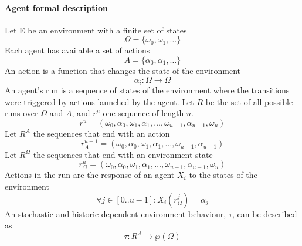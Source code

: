 \documentclass[11pt,oneside,a4paper,openright]{report}
\begin{document}

\paragraph{Agent formal description}
	
Let E be an environment with a finite set of states 
\begin{equation}
	\Omega = \{\omega_0,\omega_1,\ldots \}
\end{equation}
Each agent has available a set of actions 
\begin{equation}
	A = \{ \alpha_0, \alpha_1, \ldots \} 
\end{equation}
An action is a function that changes the state of the environment 
\begin{equation}
	\alpha_i : \Omega \longrightarrow \Omega 
\end{equation}
An agent's run is a sequence of states of the environment where the transitions were triggered 
by actions launched by the agent. Let $R$ be the set of all possible runs over $\Omega$ and $A$, and
$r^{u}$ one sequence of length $u$.
\begin{equation}
	r^{u} = ( \omega_0 , \alpha_0 , \omega_1 , \alpha_1 ,\ldots, \omega_{u-1} , \alpha_{u-1} , \omega_u )
\end{equation}
Let $R^{A}$ the sequences that end with an action 
\begin{equation}
	r^{u-1}_{A} = ( \omega_0 , \alpha_0 , \omega_1 , \alpha_1 ,\ldots, \omega_{u-1} , \alpha_{u-1} )
\end{equation}
Let $R^{\Omega}$ the sequences that end with an environment state 
\begin{equation}
	r^{u}_{\Omega} = ( \omega_0 , \alpha_0 , \omega_1 , \alpha_1 ,\ldots, \omega_{u-1} , \alpha_{u-1} , \omega_u )
\end{equation}
Actions in the run are the response of an agent $X_i$ to the states of the environment
\begin{equation}
	\forall j \in [0..u-1] : X_i(r^{j}_{\Omega}) = \alpha_j
\end{equation}
An stochastic and historic dependent environment behaviour, $\tau$, can be described as
\begin{equation}
	\tau : R^{A} \longrightarrow \wp(\Omega)
\end{equation}
\end{document}
